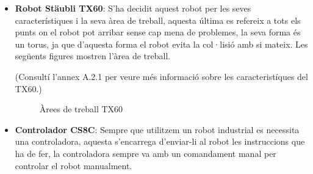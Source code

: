 ﻿\documentclass[10pt,a4paper,twocolumn,twoside]{article}
\begin{document}
\begin{itemize}
  \item \textbf{Robot Stäubli TX60}: S'ha decidit aquest robot per les seves característiques i la seva àrea de treball, aquesta última es refereix a tots els punts on el robot pot arribar sense cap mena de problemes, la seva forma és un torus, ja que d'aquesta forma el robot evita la col·lisió amb si mateix. Les següents figures mostren l'àrea de treball.

\hfill \break
(Consultí l’annex A.2.1 per veure més informació sobre les caracteristíques del TX60.)
\begin{figure}[h]
 \centering
 \caption{Àrees de treball TX60}
 \label{f:tx60}
\end{figure}

  \item\textbf{Controlador CS8C}: Sempre que utilitzem un robot industrial es necessita una controladora, aquesta s'encarrega d'enviar-li al robot les instruccions que ha de fer, la controladora sempre va amb un comandament manal per controlar el robot manualment.


\end{itemize}
\end{document}
